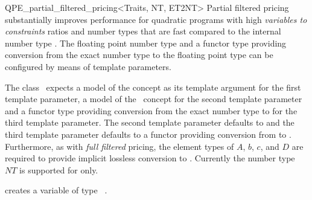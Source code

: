 \begin{ccRefClass}{QPE_partial_filtered_pricing<Traits, NT, ET2NT>}
Partial filtered pricing substantially improves performance for
quadratic programs with high \emph{variables to constraints} ratios
and number types  that are fast compared
to the internal number type . The floating point number type 
and a functor type providing conversion from the exact number type  to
the floating point type  can be configured by means of template
parameters.   


\ccInheritsFrom
{}

\ccRequirements
\ccIndexRequirements

The class \ccRefName\ expects a model of the concept
 as its template argument for the first template parameter,
a model of the \cgal \ concept  for the second template
parameter and a functor type
providing conversion from the exact number type  to 
for the third template parameter. The second template parameter defaults to
 and the third template parameter defaults to a functor providing
conversion from  to .  
Furthermore, as with \emph{full filtered} pricing, the element types
of $A$, $b$, $c$, and $D$ are required to provide implicit lossless conversion
to . Currently the number type $NT$ is supported for  only.

\ccTypes \ccIndexClassTypes


\ccCreation
\ccIndexClassCreation
{}

{creates a variable of type \ccRefName\ .}


\ccUnchecked

\ccAccessFunctions
\begin{ccIndexMemberFunctions}




\ccModifiers
{}




\end{ccIndexMemberFunctions}
\end{ccRefClass}
